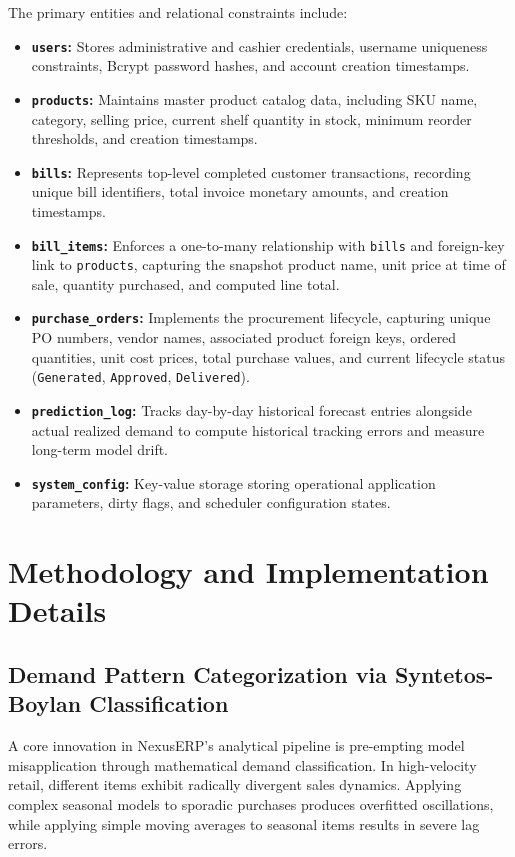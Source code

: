 The primary entities and relational constraints include:
\begin{itemize}
    \item \textbf{\texttt{users}:} Stores administrative and cashier credentials, username uniqueness constraints, Bcrypt password hashes, and account creation timestamps.
    \item \textbf{\texttt{products}:} Maintains master product catalog data, including SKU name, category, selling price, current shelf quantity in stock, minimum reorder thresholds, and creation timestamps.
    \item \textbf{\texttt{bills}:} Represents top-level completed customer transactions, recording unique bill identifiers, total invoice monetary amounts, and creation timestamps.
    \item \textbf{\texttt{bill\_items}:} Enforces a one-to-many relationship with \texttt{bills} and foreign-key link to \texttt{products}, capturing the snapshot product name, unit price at time of sale, quantity purchased, and computed line total.
    \item \textbf{\texttt{purchase\_orders}:} Implements the procurement lifecycle, capturing unique PO numbers, vendor names, associated product foreign keys, ordered quantities, unit cost prices, total purchase values, and current lifecycle status (\texttt{Generated}, \texttt{Approved}, \texttt{Delivered}).
    \item \textbf{\texttt{prediction\_log}:} Tracks day-by-day historical forecast entries alongside actual realized demand to compute historical tracking errors and measure long-term model drift.
    \item \textbf{\texttt{system\_config}:} Key-value storage storing operational application parameters, dirty flags, and scheduler configuration states.
\end{itemize}


\clearpage
\chapter{Methodology and Implementation Details}
\section{Demand Pattern Categorization via Syntetos-Boylan Classification}
A core innovation in NexusERP's analytical pipeline is pre-empting model misapplication through mathematical demand classification. In high-velocity retail, different items exhibit radically divergent sales dynamics. Applying complex seasonal models to sporadic purchases produces overfitted oscillations, while applying simple moving averages to seasonal items results in severe lag errors.

